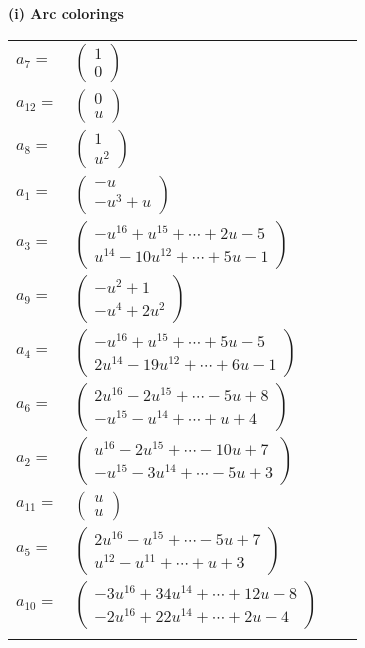 \documentclass[1p]{elsarticle_modified}
\theoremstyle{definition}
\begin{document}
\flushleft \textbf{(i) Arc colorings}\\
\begin{tabular}{m{7pt} m{180pt} m{7pt} m{180pt} }
\flushright $a_{7}=$&$\begin{pmatrix}1\\0\end{pmatrix}$ \\
\flushright $a_{12}=$&$\begin{pmatrix}0\\u\end{pmatrix}$ \\
\flushright $a_{8}=$&$\begin{pmatrix}1\\u^2\end{pmatrix}$ \\
\flushright $a_{1}=$&$\begin{pmatrix}- u\\- u^3+u\end{pmatrix}$ \\
\flushright $a_{3}=$&$\begin{pmatrix}- u^{16}+u^{15}+\cdots+2 u-5\\u^{14}-10 u^{12}+\cdots+5 u-1\end{pmatrix}$ \\
\flushright $a_{9}=$&$\begin{pmatrix}- u^2+1\\- u^4+2 u^2\end{pmatrix}$ \\
\flushright $a_{4}=$&$\begin{pmatrix}- u^{16}+u^{15}+\cdots+5 u-5\\2 u^{14}-19 u^{12}+\cdots+6 u-1\end{pmatrix}$ \\
\flushright $a_{6}=$&$\begin{pmatrix}2 u^{16}-2 u^{15}+\cdots-5 u+8\\- u^{15}- u^{14}+\cdots+u+4\end{pmatrix}$ \\
\flushright $a_{2}=$&$\begin{pmatrix}u^{16}-2 u^{15}+\cdots-10 u+7\\- u^{15}-3 u^{14}+\cdots-5 u+3\end{pmatrix}$ \\
\flushright $a_{11}=$&$\begin{pmatrix}u\\u\end{pmatrix}$ \\
\flushright $a_{5}=$&$\begin{pmatrix}2 u^{16}- u^{15}+\cdots-5 u+7\\u^{12}- u^{11}+\cdots+u+3\end{pmatrix}$ \\
\flushright $a_{10}=$&$\begin{pmatrix}-3 u^{16}+34 u^{14}+\cdots+12 u-8\\-2 u^{16}+22 u^{14}+\cdots+2 u-4\end{pmatrix}$\\&\end{tabular}
\end{document}
